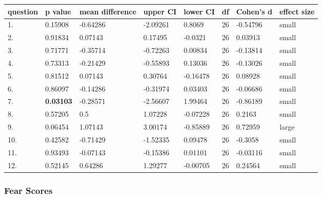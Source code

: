\documentclass[11pt, twoside, reqno]{book}
\begin{document}
\begin{table}[h!]
    \raggedright
    \begin{tabular}{|l|l|l|l|l|l|l|l|}
    \hline
        question & p value & mean difference & upper CI & lower CI & df & Cohen's d & effect size  \\ \hline
        1. & 0.15908 & -0.64286 & -2.09261 & 0.8069 & 26 & -0.54796 & small \\ \hline
        2. & 0.91834 & 0.07143 & 0.17495 & -0.0321 & 26 & 0.03913 & small  \\ \hline
        3. & 0.71771 & -0.35714 & -0.72263 & 0.00834 & 26 & -0.13814 & small  \\ \hline
        4. & 0.73313 & -0.21429 & -0.55893 & 0.13036 & 26 & -0.13026 & small \\ \hline
        5. & 0.81512 & 0.07143 & 0.30764 & -0.16478 & 26 & 0.08928 & small  \\ \hline
        6. & 0.86097 & -0.14286 & -0.31974 & 0.03403 & 26 & -0.06686 & small \\ \hline
        7. & \textbf{0.03103} & -0.28571 & -2.56607 & 1.99464 & 26 & -0.86189 & small \\ \hline
        8. & 0.57205 & 0.5 & 1.07228 & -0.07228 & 26 & 0.2163 & small \\ \hline
        9. & 0.06454 & 1.07143 & 3.00174 & -0.85889 & 26 & 0.72959 & large \\ \hline
        10. & 0.42582 & -0.71429 & -1.52335 & 0.09478 & 26 & -0.3058 & small  \\ \hline
        11. & 0.93493 & -0.07143 & -0.15386 & 0.01101 & 26 & -0.03116 & small \\ \hline
        12. & 0.52145 & 0.64286 & 1.29277 & -0.00705 & 26 & 0.24564 & small \\ \hline
    \end{tabular}
\end{table}

\subsubsection{\textbf{Fear Scores}}
\end{document}
